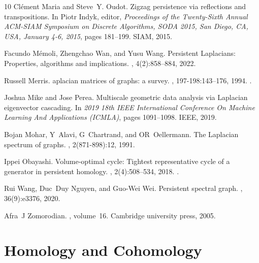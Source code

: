 \documentclass[10pt,a4paper]{amsart}
\theoremstyle{definition}
\theoremstyle{remark}
\begin{document}
\begin{thebibliography}{10}
Cl{\'{e}}ment Maria and Steve~Y. Oudot.
\newblock Zigzag persistence via reflections and transpositions.
\newblock In Piotr Indyk, editor, {\em Proceedings of the Twenty-Sixth Annual
  {ACM-SIAM} Symposium on Discrete Algorithms, {SODA} 2015, San Diego, CA, USA,
  January 4-6, 2015}, pages 181--199. {SIAM}, 2015.

Facundo M{\'e}moli, Zhengchao Wan, and Yusu Wang.
\newblock Persistent {L}aplacians: Properties, algorithms and implications.
, 4(2):858--884,
  2022.

Russell Merris.
aplacian matrices of graphs: a survey.
, 197-198:143--176, 1994.
\newblock \href {https://doi.org/10.1016/0024-3795(94)90486-3}
  {}.

Joshua Mike and Jose Perea.
\newblock Multiscale geometric data analysis via {L}aplacian eigenvector
  cascading.
\newblock In {\em 2019 18th IEEE International Conference On Machine Learning
  And Applications (ICMLA)}, pages 1091--1098. IEEE, 2019.

Bojan Mohar, Y~Alavi, G~Chartrand, and OR~Oellermann.
\newblock The {L}aplacian spectrum of graphs.
, 2(871-898):12,
  1991.

Ippei Obayashi.
\newblock Volume-optimal cycle: Tightest representative cycle of a generator in
  persistent homology.
, 2(4):508--534,
  2018.
\newblock \href {https://doi.org/10.1137/17M1159439}
  {}.

Rui Wang, Duc~Duy Nguyen, and Guo-Wei Wei.
\newblock Persistent spectral graph.
, 36(9):e3376, 2020.

Afra~J Zomorodian.
, volume~16.
\newblock Cambridge university press, 2005.

\end{thebibliography}
\appendix  
\section{Homology and Cohomology}
\label{sec:homology}
\end{document}
